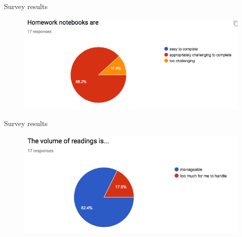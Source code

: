 \documentclass[aspectratio=169]{beamer}
\begin{document}
\begin{frame}{Survey results}
\begin{figure}
\includegraphics[width=\textwidth]{survey_hw}
\caption*{}
\end{figure}
\end{frame}

\begin{frame}{Survey results}
\begin{figure}
\includegraphics[width=\textwidth]{survey_readings}
\caption*{}
\end{figure}
\end{frame}
\end{document}
